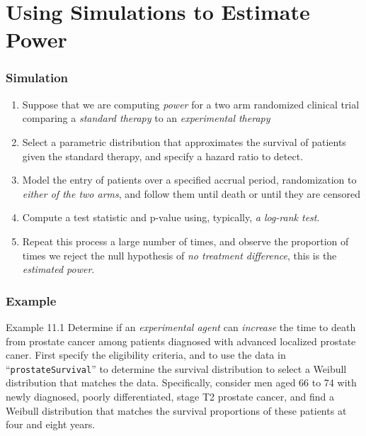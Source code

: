 \documentclass{beamer}
\newcommand{\empr}[1]{{\emph{\color{red}#1}}}
\begin{document}
\section{Using Simulations to Estimate Power}
\begin{frame}
\frametitle{Simulation}
\begin{enumerate}
\item Suppose that we are computing \empr{power} for a two arm randomized clinical trial comparing a \empr{standard therapy} to an \empr{experimental therapy}
\item Select a parametric distribution that approximates the survival of patients given the standard therapy, and specify a hazard ratio to detect.
\item Model the entry of patients over a specified accrual period, randomization to \empr{either of the two arms}, and follow them until death or until they are censored
\item Compute a test statistic and p-value using, typically, \empr{a log-rank test}.
\item Repeat this process a large number of times, and observe the proportion of times we reject the null hypothesis of \empr{no treatment difference}, this is the \empr{estimated power}.
\end{enumerate}
\end{frame}


\pagebreak
\begin{frame}
\frametitle{Example}
\begin{problock}{Example 11.1}
Determine if an \empr{experimental agent} can \empr{increase} the time to death from prostate cancer among patients diagnosed with advanced localized prostate caner. First specify the eligibility criteria, and to use the data in ``\texttt{prostateSurvival}'' to determine the survival distribution to select a Weibull distribution that matches the data. Specifically, consider men aged 66 to 74 with newly diagnosed, poorly differentiated, stage T2 prostate cancer, and find a Weibull distribution that matches the survival proportions of these patients at four and eight years.
\end{problock}
\end{frame}
\end{document}
